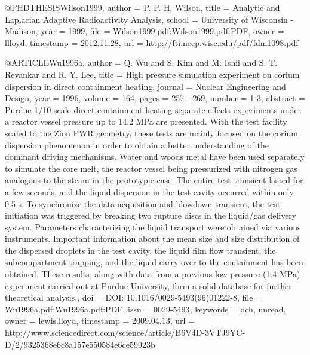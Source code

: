 {{@PHDTHESIS{Wilson1999,
  author = {P. P. H. Wilson},
  title = {Analytic and Laplacian Adaptive Radioactivity Analysis},
  school = {University of Wisconsin - Madison},
  year = {1999},
  file = {Wilson1999.pdf:Wilson1999.pdf:PDF},
  owner = {llloyd},
  timestamp = {2012.11.28},
  url = {http://fti.neep.wisc.edu/pdf/fdm1098.pdf}
}

@ARTICLE{Wu1996a,
  author = {Q. Wu and S. Kim and M. Ishii and S. T. Revankar and R. Y. Lee},
  title = {High pressure simulation experiment on corium dispersion in direct
	containment heating},
  journal = {Nuclear Engineering and Design},
  year = {1996},
  volume = {164},
  pages = {257 - 269},
  number = {1-3},
  abstract = {Purdue 1/10 scale direct containment heating separate effects experiments
	under a reactor vessel pressure up to 14.2 MPa are presented. With
	the test facility scaled to the Zion PWR geometry, these tests are
	mainly focused on the corium dispersion phenomenon in order to obtain
	a better understanding of the dominant driving mechanisms. Water
	and woods metal have been used separately to simulate the core melt,
	the reactor vessel being pressurized with nitrogen gas analogous
	to the steam in the prototypic case. The entire test transient lasted
	for a few seconds, and the liquid dispersion in the test cavity occurred
	within only 0.5 s. To synchronize the data acquisition and blowdown
	transient, the test initiation was triggered by breaking two rupture
	discs in the liquid/gas delivery system. Parameters characterizing
	the liquid transport were obtained via various instruments. Important
	information about the mean size and size distribution of the dispersed
	droplets in the test cavity, the liquid film flow transient, the
	subcompartment trapping, and the liquid carry-over to the containment
	has been obtained. These results, along with data from a previous
	low pressure (1.4 MPa) experiment carried out at Purdue University,
	form a solid database for further theoretical analysis.},
  doi = {DOI: 10.1016/0029-5493(96)01222-8},
  file = {Wu1996a.pdf:Wu1996a.pdf:PDF},
  issn = {0029-5493},
  keywords = {dch, unread},
  owner = {lewis.lloyd},
  timestamp = {2009.04.13},
  url = {http://www.sciencedirect.com/science/article/B6V4D-3VTJ9YC-D/2/9325368e6c8a157e550584e6ce59923b}
}

}}
